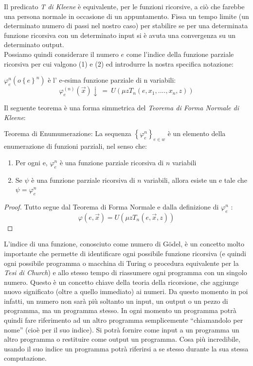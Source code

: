 Il predicato \textit{T di Kleene} \`e equivalente, per le funzioni ricorsive, a ci\`o che farebbe una persona normale in occasione di un appuntamento. Fissa un tempo limite (un determinato numero di passi nel nostro caso) per stabilire se per una determinata funzione ricorsiva con un determinato input si \`e avuta una convergenza su un determinato output.\\


Possiamo quindi considerare il numero $e$ come l'indice della funzione parziale ricorsiva per cui valgono (1) e (2) ed introdurre la nostra specifica notazione:
\begin{defi}
$
\varphi^{n}_{e} \left( o \left\lbrace e  \right\rbrace^n  \right)
$
\`e l' e-esima funzione parziale di n va\-ria\-bi\-li:
\[
\varphi^{\left( n \right)}_{e} \left( \overrightarrow{x}\right)\downarrow\ =\ U \left( \mu  z T_{n}\left(e,x_1,....,x_n,z \right) \right)
\]
\end{defi}
Il seguente teorema \`e una forma simmetrica del \textit{Teorema di Forma Normale di Kleene}:

\begin{thm}
Teorema di Enumumerazione: La sequenza $ \left\lbrace   \varphi^{n}_{e} \right\rbrace_{e \in w} $ \`e un elemento della enumerazione di funzioni parziali, nel senso che:

\begin{enumerate}
\item Per ogni e, $\varphi^{n}_{e}$ \`e una funzione parziale ricorsiva di $n$ variabili
\item Se $\psi$ \`e una funzione parziale ricorsiva di $n$ variabili, allora esiste un e tale che $\psi = \varphi^{n}_{e}$
\end{enumerate}
\end{thm}

\begin{proof}
Tutto segue dal Teorema di Forma Normale e dalla definizione di $\varphi^{n}_{e}$ :
$$\varphi \left( e,\overrightarrow{x} \right) = U \left( \mu  z   T_{n}\left( e,\overrightarrow{x},z\right) \right)$$
\end{proof}

L'indice di una funzione, conosciuto come numero di G\"odel, \`e un concetto molto importante che permette di identificare ogni possibile funzione ricorsiva (e quindi ogni possibile programma o macchina di Turing o procedura equivalente per la \textit{Tesi di Church}) e allo stesso tempo di riassumere ogni programma con un singolo numero. Questo \`e un concetto chiave della teoria della ricorsione, che aggiunge nuovo significato (oltre a quello immediato) ai numeri. Da questo momento in poi infatti, un numero non sar\`a pi\`u soltanto un input, un output o un pezzo di programma, ma un programma stesso. In ogni momento un programma potr\`a quindi fare riferimento ad un altro programma semplicemente "`chiamandolo per nome"' (cio\`e per il suo indice). Si potr\`{a} fornire come input a un programma un altro programma o restituire come output un programma. Cosa pi\`u incredibile, usando il suo indice un programma potr\`a riferirsi a se stesso durante la sua stessa computazione.

